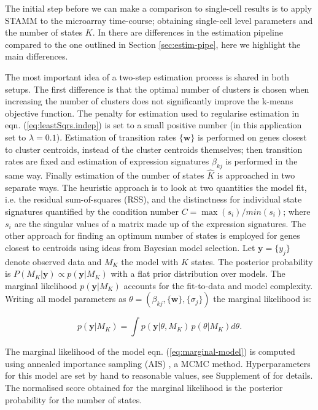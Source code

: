 The initial step before we can make a comparison to single-cell results is to apply STAMM to the microarray time-course; obtaining single-cell level parameters and the number of states $K$. In  \cite{Armond:2013} there are differences in the estimation pipeline compared to the one outlined in Section \ref{sec:estim-pipe}, here we highlight the main differences.

The most important idea of a two-step estimation process is shared in both setups. The first difference is that the optimal number of clusters is chosen when increasing the number of clusters does not significantly improve the k-means objective function. The penalty for estimation used to regularise estimation in eqn. (\ref{eq:leastSqrs.indep}) is set to a small positive number (in this application set to $ \lambda = 0.1 $). Estimation of transition rates $\lbrace \mathbf{w} \rbrace $ is performed on genes closest to cluster centroids, instead of the cluster centroids themselves; then transition rates are fixed and estimation of expression signatures $\beta_{kj}$ is performed in the same way. Finally estimation of the number of states $\hat{K}$ is approached in two separate ways. The heuristic approach is to look at two quantities the model fit, i.e. the residual sum-of-squares (RSS), and the distinctness for individual state signatures quantified by the condition number $C = \max(s_i) / min(s_i)$; where $s_i$ are the singular values of a matrix made up of the expression signatures. The other approach for finding an optimum number of states is employed for genes closest to centroids using ideas from Bayesian model selection. Let $\mathbf{y} = \lbrace y_j \rbrace$ denote observed data and $M_K$ the model with $K$ states. The posterior probability is $P(M_K | \mathbf{y}) \propto p(\mathbf{y}|M_K) $ with a flat prior distribution over models. The marginal likelihood $p(\mathbf{y} | M_K)$ accounts for the fit-to-data and model complexity. Writing all model parameters as $\theta = (\beta_{kj}, \lbrace \mathbf{w} \rbrace, \lbrace \sigma_j \rbrace) $ the marginal likelihood is:

\begin{equation}
  \label{eq:marginal-model}
  p(\mathbf{y} | M_K) = \int p(\mathbf{y} | \theta, M_K)\, p(\theta | M_K) d\theta.
\end{equation}

The marginal likelihood of the model eqn. (\ref{eq:marginal-model}) is computed using annealed importance sampling (AIS) \citep{Neal:2001ed}, a MCMC method. Hyperparameters for this model are set by hand to reasonable values, see Supplement of \cite{Armond:2013} for details. The normalised score obtained for the marginal likelihood is the posterior probability for the number of states.

